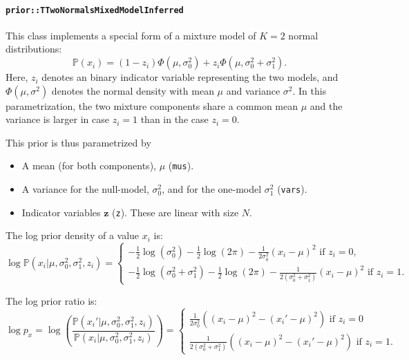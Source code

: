 \documentclass[a4paper,11pt]{article}
\def\z{\boldsymbol{z}}
\def\p{\mathbb{P}}
\newcommand{\class}[1]{\texttt{#1}}
\newcommand{\privparam}[1]{\texttt{\textunderscore #1}}
\begin{document}
\paragraph{\class{prior::TTwoNormalsMixedModelInferred}}
This class implements a special form of a mixture model of $K=2$ normal distributions:
\begin{equation*}
 \p(x_i) = (1-z_i) \Phi(\mu, \sigma_0^2) + z_i \Phi(\mu, \sigma_0^2+\sigma_1^2).
\end{equation*}
Here, $z_i$ denotes an binary indicator variable representing the two models, and $\Phi(\mu, \sigma^2)$ denotes the normal density with mean $\mu$ and variance $\sigma^2$. In this parametrization, the two mixture components share a common mean $\mu$ and the variance is larger in case $z_i = 1$ than in the case $z_i = 0$.

This prior is thus parametrized by
\begin{itemize}
\item A mean (for both components), $\mu$ (\privparam{mus}).
\item A variance for the null-model, $\sigma_0^2$, and for the one-model $\sigma_1^2$ (\privparam{vars}).
\item Indicator variables $\z$ (\privparam{z}). These are linear with size $N$.
\end{itemize}

The log prior density of a value $x_i$ is:
\begin{equation}\label{eq:logPriorDensity_NormalTwoMixedModel}
\log \p(x_i|\mu, \sigma_0^2, \sigma_1^2, z_i) =
\begin{cases}
 -\frac{1}{2}\log(\sigma_0^2) - \frac{1}{2}\log(2\pi) - \frac{1}{2\sigma_0^2}(x_i - \mu)^2 \text{ if } z_i = 0, \\
  -\frac{1}{2}\log(\sigma_0^2 + \sigma_1^2) - \frac{1}{2}\log(2\pi) - \frac{1}{2 ( \sigma_0^2 + \sigma_1^2)}(x_i - \mu)^2 \text{ if } z_i = 1.
\end{cases}
\end{equation}

The log prior ratio is:
\begin{equation*}
 \log p_x = \log \left( \frac{\p(x_i'|\mu, \sigma_0^2, \sigma_1^2, z_i)}{\p(x_i|\mu, \sigma_0^2, \sigma_1^2, z_i)} \right) =
 \begin{cases}
 \frac{1}{2\sigma_0^2}\left((x_i - \mu)^2 - (x_i' - \mu)^2\right) \text{ if } z_i = 0 \\
 \frac{1}{2(\sigma_0^2+\sigma_1^2)}\left((x_i - \mu)^2 - (x_i' - \mu)^2\right) \text{ if } z_i = 1.
\end{cases}
\end{equation*}
\end{document}

